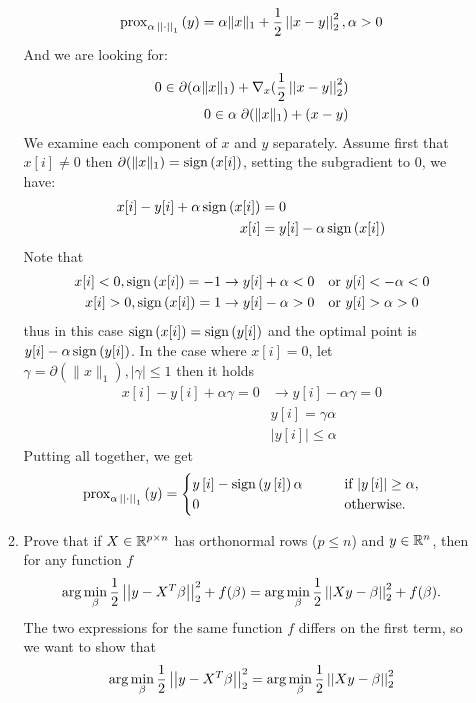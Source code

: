 \documentclass[12pt,twoside]{article}
\begin{document}
\begin{enumerate}
\begin{enumerate}
$$
\operatorname{prox}_{\alpha \, \left|\left|  \cdot  \right|\right| _{1}}\left(  y  \right) = \alpha \|x\|_1 + \frac{1}{2} \left|\left| x-y \right|\right| _{2}^2, \alpha > 0
$$
And we are looking for:
\begin{align*}
	0 \in \partial( \alpha \|x\|_1) + \nabla_x (\frac{1}{2} \left|\left| x-y \right|\right| _{2}^2) \\
	0 \in \alpha \; \partial( \|x\|_1) + (x-y) \\
\end{align*}
We examine each component of $x$ and $y$ separately.
Assume first that $x[i] \neq 0$ then $ \partial( \|x\|_1) = \operatorname{sign}\left( x[i] \right)$, setting the subgradient to $0$, we have:
\begin{align*}
	x[i] - y[i] + \alpha \operatorname{sign}\left( x[i] \right)	&= 0 \\
	x[i]					&= y[i] - \alpha \operatorname{sign}\left( x[i] \right) \\
\end{align*}
Note that
\begin{align*}
	x[i] < 0, \operatorname{sign}\left( x[i] \right) = -1 &\rightarrow y[i] + \alpha < 0 \text{ ~ or }  y[i] < -\alpha < 0 \\
	x[i] > 0, \operatorname{sign}\left( x[i] \right) = 1 &\rightarrow y[i] - \alpha > 0 \text{ ~ or }  y[i] > \alpha > 0 \\
\end{align*}
thus in this case $\operatorname{sign}\left( x[i] \right) = \operatorname{sign}\left( y[i] \right)$ and the optimal point is $y[i] - \alpha \operatorname{sign}\left( y[i] \right)$.
In the case where $x[i]=0$, let $\gamma =  \partial(\|x\|_1), | \gamma | \le 1$ then it holds
\begin{align*}
	x[i] - y[i] + \alpha \gamma = 0 &\rightarrow y[i] - \alpha \gamma = 0 \\
							&	y[i] = \gamma \alpha \\
							& |y[i]| \le \alpha
\end{align*}
Putting all together, we get
\begin{align}
\operatorname{prox}_{\alpha \, \left|\left|  \cdot  \right|\right| _{1}}\left(  y  \right) = 
\begin{cases}
y\,[i] - \operatorname{sign}\left( y\,[i] \right) \alpha  \qquad & \text{if $\lvert y\,[i]\rvert \geq \alpha$}, \\
0 \quad & \text{otherwise}.
\end{cases}
\end{align}

    \item Prove that if $X \in \mathbb{R}^{p \times n}$ has orthonormal rows ($p \leq n$) and $y \in \mathbb{R}^{n}$, then for any function $f$
\begin{align}
\arg \min_{\beta} \frac{1}{2} \left|\left|  y - X^T\beta  \right|\right| _{2}^2 + f(\beta) = \arg \min_{\beta} \frac{1}{2} \left|\left|  Xy - \beta  \right|\right| _{2}^2 + f(\beta).
\end{align}
The two expressions for the same function $f$ differs on the first term, so we want to show that
$$
\arg \min_{\beta} \frac{1}{2} \left|\left|  y - X^T\beta  \right|\right| _{2}^2  =  \arg \min_{\beta} \frac{1}{2} \left|\left|  Xy - \beta  \right|\right| _{2}^2
$$


\end{enumerate}
\end{enumerate}
\end{document}

